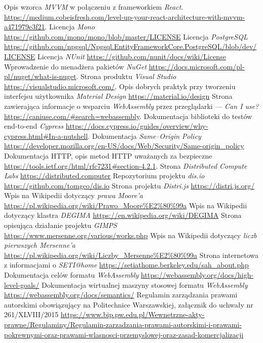 \documentclass[a4paper,11pt,twoside]{report}
\theoremstyle{definition}
\begin{document}
\begin{thebibliography}{35}
     Opis wzorca \emph{MVVM} w połączeniu z frameworkiem \emph{React}. \url{https://medium.cobeisfresh.com/level-up-your-react-architecture-with-mvvm-a471979e3f21}.
     Licencja \emph{Mono} \url{https://github.com/mono/mono/blob/master/LICENSE}
     Licencja \emph{PostgreSQL} \url{https://github.com/npgsql/Npgsql.EntityFrameworkCore.PostgreSQL/blob/dev/LICENSE}
     Licencja \emph{NUnit} \url{https://github.com/nunit/docs/wiki/License}
     Wprowadzenie do menadżera pakietów \emph{NuGet} \url{https://docs.microsoft.com/pl-pl/nuget/what-is-nuget}.
     Strona produktu \emph{Visual Studio} \url{https://visualstudio.microsoft.com/}.
     Opis dobrych praktyk przy tworzeniu interfejsu użytkownika \emph{Material Design} \url{https://material.io/design}
     Strona zawierająca informacje o wsparciu \textit{WebAssembly} przez przeglądarki --- \emph{Can I use?} \url{https://caniuse.com/#search=webassembly}.
     Dokumentacja biblioteki do testów end-to-end \emph{Cypress} \url{https://docs.cypress.io/guides/overview/why-cypress.html#In-a-nutshell}.
     Dokumentacja \emph{Same--Origin Policy} \url{https://developer.mozilla.org/en-US/docs/Web/Security/Same-origin_policy}
     Dokumentacja HTTP, opis metod HTTP uważanych za bezpieczne \url{https://tools.ietf.org/html/rfc7231#section-4.2.1}.
     Strona \emph{Distributed Compute Labs} \url{https://distributed.computer}
     Repozytorium projektu \emph{dis.io} \url{https://github.com/tomgco/dis.io}
     Strona projektu \emph{Distri.js} \url{https://distri.js.org/}
     Wpis na Wikipedii dotyczący \emph{prawa Moore'a} \url{https://pl.wikipedia.org/wiki/Prawo_Moore%E2%80%99a}
     Wpis na Wikipedii dotyczący klastra \emph{DEGIMA} \url{https://en.wikipedia.org/wiki/DEGIMA}
     Strona opisująca działanie projektu \emph{GIMPS} \url{https://www.mersenne.org/various/works.php}
     Wpis na Wikipedii dotyczący \emph{liczb pierwszych Mersenne'a} \url{https://pl.wikipedia.org/wiki/Liczby_Mersenne%E2%80%99a}
     Strona internetowa z informacjami o \emph{SETI@home} \url{https://setiathome.berkeley.edu/sah_about.php}
     Dokumentacja celów formatu \emph{WebAssembly} \url{https://webassembly.org/docs/high-level-goals/}
     Dokumentacja wirtualnej maszyny stosowej formatu \emph{WebAssembly} \url{https://webassembly.org/docs/semantics/}
     Regulamin zarządzania prawami autorskimi obowiązujący na Politechnice Warszawskiej, załącznik do uchwały nr 261/XLVIII/2015 \url{https://www.bip.pw.edu.pl/Wewnetrzne-akty-prawne/Regulaminy/Regulamin-zarzadzania-prawami-autorskimi-i-prawami-pokrewnymi-oraz-prawami-wlasnosci-przemyslowej-oraz-zasad-komercjalizacji}
\end{thebibliography}
\end{document}
